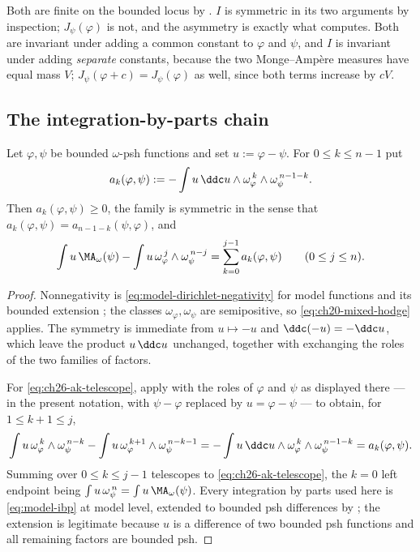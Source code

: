 Both are finite on the bounded locus by
.  $I$ is symmetric in its two arguments
by inspection; $J_\psi(\varphi)$ is not, and the asymmetry is exactly what
 computes.  Both are invariant under
adding a common constant to $\varphi$ and $\psi$, and $I$ is invariant
under adding \emph{separate} constants, because the two Monge--Amp\`ere
measures have equal mass $V$; $J_\psi(\varphi+c)=J_\psi(\varphi)$ as
well, since both terms increase by $cV$.

\subsection{The integration-by-parts chain}
\label{sec:ch26-ibp-chain}

\begin{lemma}
\label{lem:ch26-dirichlet-coefficients}
Let $\varphi,\psi$ be bounded $\omega$-psh functions and set
$u:=\varphi-\psi$.  For $0\leq k\leq n-1$ put
\begin{equation}
\label{eq:ch26-ak}
 a_k(\varphi,\psi)
 :=-\int u\,\ddc u\wedge
     \omega_\varphi^{\,k}\wedge\omega_\psi^{\,n-1-k}.
\end{equation}
Then $a_k(\varphi,\psi)\geq0$, the family is symmetric in the sense that
$a_k(\varphi,\psi)=a_{n-1-k}(\psi,\varphi)$, and
\begin{equation}
\label{eq:ch26-ak-telescope}
 \int u\,\MA_\omega(\psi)-\int u\,
   \omega_\varphi^{\,j}\wedge\omega_\psi^{\,n-j}
 =\sum_{k=0}^{j-1}a_k(\varphi,\psi)
 \qquad(0\leq j\leq n).
\end{equation}
\end{lemma}

\begin{proof}
Nonnegativity is \eqref{eq:model-dirichlet-negativity} for model functions
and its bounded extension ; the classes
$\omega_\varphi,\omega_\psi$ are semipositive, so
\eqref{eq:ch20-mixed-hodge} applies.  The symmetry is immediate from
$u\mapsto-u$ and $\ddc(-u)=-\ddc u$, which leave the product
$u\,\ddc u$ unchanged, together with exchanging the roles of the two
families of factors.

For \eqref{eq:ch26-ak-telescope}, apply  with the
roles of $\varphi$ and $\psi$ as displayed there --- in the present
notation, with $\psi-\varphi$ replaced by $u=\varphi-\psi$ --- to obtain,
for $1\leq k+1\leq j$,
\[
 \int u\,\omega_\varphi^{\,k}\wedge\omega_\psi^{\,n-k}
 -\int u\,\omega_\varphi^{\,k+1}\wedge\omega_\psi^{\,n-k-1}
 =-\int u\,\ddc u\wedge\omega_\varphi^{\,k}\wedge\omega_\psi^{\,n-1-k}
 =a_k(\varphi,\psi).
\]
Summing over $0\leq k\leq j-1$ telescopes to
\eqref{eq:ch26-ak-telescope}, the $k=0$ left endpoint being
$\int u\,\omega_\psi^{\,n}=\int u\,\MA_\omega(\psi)$.  Every integration by
parts used here is \eqref{eq:model-ibp} at model level, extended to bounded
psh differences by ; the extension is
legitimate because $u$ is a difference of two bounded psh functions and all
remaining factors are bounded psh.
\end{proof}

